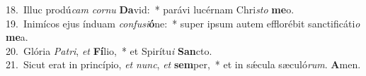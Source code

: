 {18.~}Illuc prodú\textit{cam} \textit{cor}\textit{nu} \textbf{Da}vid:~* parávi lucérnam Chri\textit{sto} \textbf{me}o.\\
{19.~}Inimícos ejus índuam \textit{con}\textit{fu}\textit{si}\textbf{ó}ne:~* super ipsum autem efflorébit sanctificáti\textit{o} \textbf{me}a.\\
{20.~}Glória \textit{Pa}\textit{tri}, \textit{et} \textbf{Fí}lio,~* et Spirítu\textit{i} \textbf{San}cto.\\
{21.~}Sicut erat in princípio, \textit{et} \textit{nunc}, \textit{et} \textbf{sem}per,~* et in sǽcula sæculó\textit{rum}. \textbf{A}men.\\
